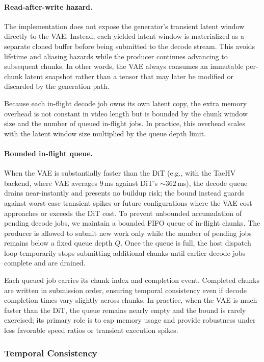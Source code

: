 \paragraph{Read-after-write hazard.}
The implementation does not expose the generator’s transient latent window directly to the VAE. Instead, each yielded latent window is materialized as a separate cloned buffer before being submitted to the decode stream. This avoids lifetime and aliasing hazards while the producer continues advancing to subsequent chunks. In other words, the VAE always consumes an immutable per-chunk latent snapshot rather than a tensor that may later be modified or discarded by the generation path.

Because each in-flight decode job owns its own latent copy, the extra memory overhead is not constant in video length but is bounded by the chunk window size and the number of queued in-flight jobs. In practice, this overhead scales with the latent window size multiplied by the queue depth limit.

\paragraph{Bounded in-flight queue.}
When the VAE is substantially faster than the DiT (e.g., with the TaeHV backend, where VAE averages $9$\,ms against DiT's ${\sim}362$\,ms), the decode queue drains near-instantly and presents no buildup risk; the bound instead guards against worst-case transient spikes or future configurations where the VAE cost approaches or exceeds the DiT cost. To prevent unbounded accumulation of pending decode jobs, we maintain a bounded FIFO queue of in-flight chunks. The producer is allowed to submit new work only while the number of pending jobs remains below a fixed queue depth \(Q\). Once the queue is full, the host dispatch loop temporarily stops submitting additional chunks until earlier decode jobs complete and are drained.

Each queued job carries its chunk index and completion event. Completed chunks are written in submission order, ensuring temporal consistency even if decode completion times vary slightly across chunks. In practice, when the VAE is much faster than the DiT, the queue remains nearly empty and the bound is rarely exercised; its primary role is to cap memory usage and provide robustness under less favorable speed ratios or transient execution spikes.

\subsubsection{Temporal Consistency}

